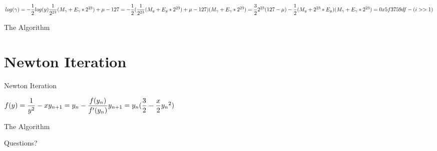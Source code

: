 \documentclass[10pt]{beamer}
\begin{document}
\begin{frame}[fragile]{}
    $ 
    log(\gamma) = -\dfrac{1}{2}log(y)
    \newline
    \newline
    \dfrac{1}{{2}^{23}}(M_{\gamma} + E_{\gamma} * {2}^{23}) + \mu - 127 =
    -\dfrac{1}{2}(\dfrac{1}{{2}^{23}}(M_{y} + E_{y} * {2}^{23}) + \mu - 127)
    \newline
    \newline
    (M_{\gamma} + E_{\gamma} * {2}^{23}) = \dfrac{3}{2}{2}^{23}(127 - \mu) - \dfrac{1}{2}(M_y + {2}^{23}*E_y)
    \newline
    \newline
    (M_{\gamma} + E_{\gamma} * {2}^{23}) = 0x5f3759df - (i >> 1)
    
    $
\end{frame}

\begin{frame}{The Algorithm}

\end{frame}

\section{Newton Iteration}

\begin{frame}{Newton Iteration}
  
  $
  f(y) = \dfrac{1}{{y}^2} - x
  \newline
  \newline
  y_{n + 1} = y_n - \dfrac{f(y_n)}{f^\prime(y_n)}
  \newline\newline
  y_{n + 1} = y_n(\dfrac{3}{2} - \dfrac{x}{2}{y_n}^2)
  $
\end{frame}

\begin{frame}{The Algorithm}

\end{frame}

{
\begin{frame}[standout]
  Questions?
\end{frame}
}
\end{document}

